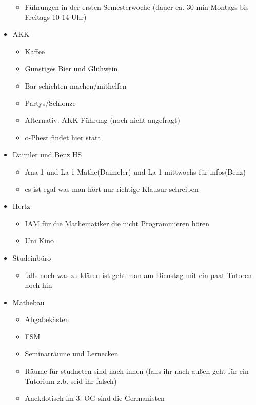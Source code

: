 \documentclass[10pt,twocolumn,ngerman]{scrartcl}
\begin{document}
\begin{itemize}
\begin{itemize}
            \item Führungen in der ersten Semesterwoche (dauer ca. 30 min Montags bis Freitags 10-14 Uhr)
        \end{itemize}
    \item AKK
        \begin{itemize}
            \item Kaffee
            \item Günstiges Bier und Glühwein
            \item Bar schichten machen/mithelfen
            \item Partys/Schlonze
            \item Alternativ: AKK Führung (noch nicht angefragt)
            \item o-Phest findet hier statt
        \end{itemize}
    \item Daimler und Benz HS
        \begin{itemize}
            \item Ana 1 und La 1 Mathe(Daimeler) und La 1 mittwochs für infos(Benz)
            \item es ist egal was man hört nur richtige Klausur schreiben
        \end{itemize}
    \item Hertz
        \begin{itemize}
            \item IAM für die Mathematiker die nicht Programmieren hören
            \item Uni Kino
        \end{itemize}
    \item Studeinbüro
        \begin{itemize}
            \item falls noch was zu klären ist geht man am Dienstag mit ein paat Tutoren
                noch hin
        \end{itemize}
    \item Mathebau
        \begin{itemize}
            \item Abgabekästen
            \item FSM
            \item Seminarräume und Lernecken
            \item Räume für studneten sind nach innen (falls ihr nach außen geht für
                ein Tutorium z.b. seid ihr falsch)
            \item Anekdotisch im 3. OG sind die Germanisten

\end{itemize}
\end{itemize}
\end{document}
